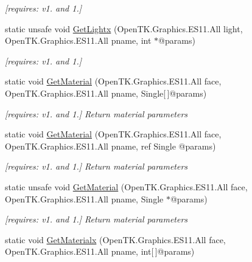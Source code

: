 \begin{DoxyCompactItemize}
\begin{DoxyCompactList}\small\item\em \mbox{[}requires\-: v1. and 1.\mbox{]}\end{DoxyCompactList}\item 
static unsafe void \hyperlink{class_open_t_k_1_1_graphics_1_1_e_s11_1_1_g_l_aab79eab7ad2c4df1f88c2732b1051fca}{Get\-Lightx} (Open\-T\-K.\-Graphics.\-E\-S11.\-All light, Open\-T\-K.\-Graphics.\-E\-S11.\-All pname, int $\ast$@params)
\begin{DoxyCompactList}\small\item\em \mbox{[}requires\-: v1. and 1.\mbox{]}\end{DoxyCompactList}\item 
static void \hyperlink{class_open_t_k_1_1_graphics_1_1_e_s11_1_1_g_l_acedf3027770c7830f66fc5e580dc0fa1}{Get\-Material} (Open\-T\-K.\-Graphics.\-E\-S11.\-All face, Open\-T\-K.\-Graphics.\-E\-S11.\-All pname, Single\mbox{[}$\,$\mbox{]}@params)
\begin{DoxyCompactList}\small\item\em \mbox{[}requires\-: v1. and 1.\mbox{]} Return material parameters \end{DoxyCompactList}\item 
static void \hyperlink{class_open_t_k_1_1_graphics_1_1_e_s11_1_1_g_l_ac5c39aabbc617e377cc065d565a367db}{Get\-Material} (Open\-T\-K.\-Graphics.\-E\-S11.\-All face, Open\-T\-K.\-Graphics.\-E\-S11.\-All pname, ref Single @params)
\begin{DoxyCompactList}\small\item\em \mbox{[}requires\-: v1. and 1.\mbox{]} Return material parameters \end{DoxyCompactList}\item 
static unsafe void \hyperlink{class_open_t_k_1_1_graphics_1_1_e_s11_1_1_g_l_ad47034726e681747c251351c9e8bc638}{Get\-Material} (Open\-T\-K.\-Graphics.\-E\-S11.\-All face, Open\-T\-K.\-Graphics.\-E\-S11.\-All pname, Single $\ast$@params)
\begin{DoxyCompactList}\small\item\em \mbox{[}requires\-: v1. and 1.\mbox{]} Return material parameters \end{DoxyCompactList}\item 
static void \hyperlink{class_open_t_k_1_1_graphics_1_1_e_s11_1_1_g_l_a9c6e14bde2f80e4f2ddad770564567a1}{Get\-Materialx} (Open\-T\-K.\-Graphics.\-E\-S11.\-All face, Open\-T\-K.\-Graphics.\-E\-S11.\-All pname, int\mbox{[}$\,$\mbox{]}@params)

\end{DoxyCompactItemize}
